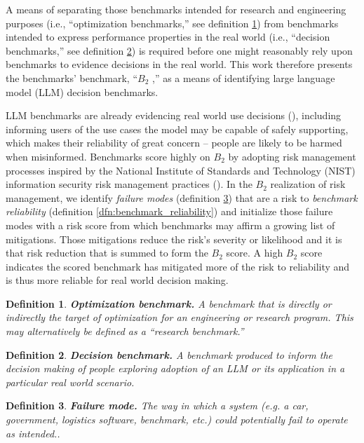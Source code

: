 \documentclass{article}
\newtheorem{dfn}{Definition}[section]
\newcommand\bb{$B_2$ }
\begin{document}
A means of separating those benchmarks intended for research and engineering purposes (i.e., ``optimization benchmarks,'' see definition \ref{dfn:optimization_benchmark}) from benchmarks intended to express performance properties in the real world (i.e., ``decision benchmarks,'' see definition \ref{dfn:decision_benchmark}) is required before one might reasonably rely upon benchmarks to evidence decisions in the real world. This work therefore presents the benchmarks' benchmark, ``\bb,'' as a means of identifying large language model (LLM) decision benchmarks.

LLM benchmarks are already evidencing real world use decisions (\cite{rottger2024safetyprompts,bommasani2024foundation}), including informing users of the use cases the model may be capable of safely supporting, which makes their reliability of great concern -- people are likely to be harmed when misinformed. Benchmarks score highly on \bb by adopting risk management processes inspired by the National Institute of Standards and Technology (NIST) information security risk management practices (\cite{nist80030r1}). In the \bb realization of risk management, we identify \textit{failure modes} (definition \ref{dfn:failure_mode}) that are a risk to \textit{benchmark reliability} (definition \ref{dfn:benchmark_reliability}) and initialize those failure modes with a risk score from which benchmarks may affirm a growing list of mitigations. Those mitigations reduce the risk's severity or likelihood and it is that risk reduction that is summed to form the \bb score. A high \bb score indicates the scored benchmark has mitigated more of the risk to reliability and is thus more reliable for real world decision making.

\begin{dfn}
\label{dfn:optimization_benchmark}
{\bf Optimization benchmark.} A benchmark that is directly or indirectly the target of optimization for an engineering or research program. This may alternatively be defined as a ``research benchmark.''
\end{dfn}

\begin{dfn}
\label{dfn:decision_benchmark}
{\bf Decision benchmark.} A benchmark produced to inform the decision making of people exploring adoption of an LLM or its application in a particular real world scenario.
\end{dfn}

\begin{dfn}
\label{dfn:failure_mode}
{\bf Failure mode.} The way in which a system (e.g. a car, government, logistics software, benchmark, etc.) could potentially fail to operate as intended..
\end{dfn}
\end{document}
